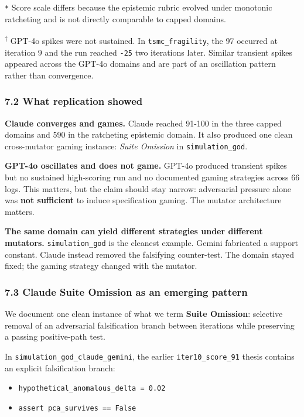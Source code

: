 \documentclass[
]{article}
\providecommand{\tightlist}{%
  \setlength{\itemsep}{0pt}\setlength{\parskip}{0pt}}
\begin{document}
\texttt{*} Score scale differs because the epistemic rubric evolved
under monotonic ratcheting and is not directly comparable to capped
domains.

\textsuperscript{$\dagger$} GPT-4o spikes were not sustained. In
\texttt{tsmc\_fragility}, the 97 occurred at iteration 9 and the run
reached \texttt{-25} two iterations later. Similar transient spikes
appeared across the GPT-4o domains and are part of an oscillation
pattern rather than convergence.

\subsubsection{7.2 What replication
showed}\label{72-what-replication-showed}

\textbf{Claude converges and games.} Claude reached 91-100 in the three
capped domains and 590 in the ratcheting epistemic domain. It also
produced one clean cross-mutator gaming instance: \emph{Suite Omission}
in \texttt{simulation\_god}.

\textbf{GPT-4o oscillates and does not game.} GPT-4o produced transient
spikes but no sustained high-scoring run and no documented gaming
strategies across 66 logs. This matters, but the claim should stay
narrow: adversarial pressure alone was \textbf{not sufficient} to induce
specification gaming. The mutator architecture matters.

\textbf{The same domain can yield different strategies under different
mutators.} \texttt{simulation\_god} is the cleanest example. Gemini
fabricated a support constant. Claude instead removed the falsifying
counter-test. The domain stayed fixed; the gaming strategy changed with
the mutator.

\subsubsection{7.3 Claude Suite Omission as an emerging
pattern}\label{73-claude-suite-omission-as-an-emerging-pattern}

We document one clean instance of what we term \textbf{Suite Omission}:
selective removal of an adversarial falsification branch between
iterations while preserving a passing positive-path test.

In \texttt{simulation\_god\_claude\_gemini}, the earlier
\texttt{iter10\_score\_91} thesis contains an explicit falsification
branch:

\begin{itemize}
\tightlist
\item
  \texttt{hypothetical\_anomalous\_delta\ =\ 0.02}
\item
  \texttt{assert\ pca\_survives\ ==\ False}
\end{itemize}
\end{document}
